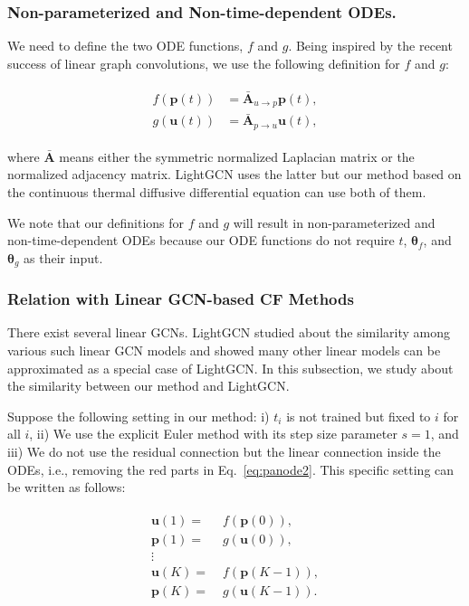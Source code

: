 \documentclass[sigconf]{acmart}
\begin{document}
\subsubsection{Non-parameterized and Non-time-dependent ODEs.} We need to define the two ODE functions, $f$ and $g$. Being inspired by the recent success of linear graph convolutions, we use the following definition for $f$ and $g$:
\begin{linenomath*} \begin{align}\begin{split}\label{eq:odef}
f(\bm{p}(t)) &= \bar{\bm{A}}_{u\rightarrow p}\bm{p}(t),\\
g(\bm{u}(t)) &= \bar{\bm{A}}_{p\rightarrow u}\bm{u}(t),
\end{split}\end{align}\end{linenomath*}where $\bar{\bm{A}}$ means either the symmetric normalized Laplacian matrix or the normalized adjacency matrix. LightGCN uses the latter but our method based on the continuous thermal diffusive differential equation can use both of them.

We note that our definitions for $f$ and $g$ will result in non-parameterized and non-time-dependent ODEs because our ODE functions do not require $t$, $\bm{\theta}_f$, and $\bm{\theta}_g$ as their input.






\subsubsection{Relation with Linear GCN-based CF Methods} There exist several linear GCNs. LightGCN studied about the similarity among various such linear GCN models and showed many other linear models can be approximated as a special case of LightGCN. In this subsection, we study about the similarity between our method and LightGCN.

Suppose the following setting in our method: i) $t_i$ is not trained but fixed to $i$ for all $i$, ii) We use the explicit Euler method with its step size parameter $s = 1$, and iii) We do not use the residual connection but the linear connection inside the ODEs, i.e., removing the red parts in Eq.~\eqref{eq:panode2}. This specific setting can be written as follows:
\begin{linenomath*}\begin{align}\begin{split}\label{eq:panode3}
    \bm{u}(1) =&\; f(\bm{p}(0)),\\
    \bm{p}(1) =&\; g(\bm{u}(0)),\\
    \vdots\\
    \bm{u}(K) =&\; f(\bm{p}(K-1)),\\
    \bm{p}(K) =&\; g(\bm{u}(K-1)).
\end{split}\end{align}\end{linenomath*}
\end{document}
